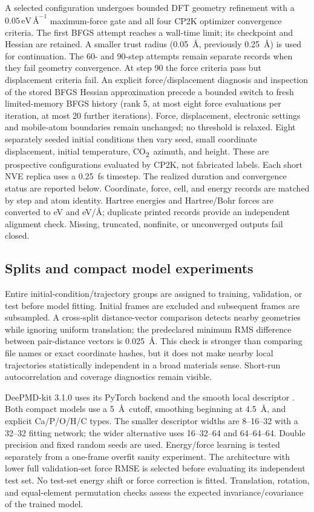 \documentclass[11pt,a4paper]{article}
\newcommand{\COtwo}{CO\textsubscript{2}}
\newcommand{\forceunit}{\,\mathrm{eV}\,\text{\AA}^{-1}}
\begin{document}
A selected configuration undergoes bounded DFT geometry refinement with a $0.05\forceunit$ maximum-force gate and all four CP2K optimizer convergence criteria. The first BFGS attempt reaches a wall-time limit; its checkpoint and Hessian are retained. A smaller trust radius (0.05~\AA, previously 0.25~\AA) is used for continuation. The 60- and 90-step attempts remain separate records when they fail geometry convergence. At step 90 the force criteria pass but displacement criteria fail. An explicit force/displacement diagnosis and inspection of the stored BFGS Hessian approximation precede a bounded switch to fresh limited-memory BFGS history (rank 5, at most eight force evaluations per iteration, at most 20 further iterations). Force, displacement, electronic settings and mobile-atom boundaries remain unchanged; no threshold is relaxed. Eight separately seeded initial conditions then vary seed, small coordinate displacement, initial temperature, \COtwo\ azimuth, and height. These are prospective configurations evaluated by CP2K, not fabricated labels. Each short NVE replica uses a 0.25~fs timestep. The realized duration and convergence status are reported below. Coordinate, force, cell, and energy records are matched by step and atom identity. Hartree energies and Hartree/Bohr forces are converted to eV and eV/\AA; duplicate printed records provide an independent alignment check. Missing, truncated, nonfinite, or unconverged outputs fail closed.

\subsection{Splits and compact model experiments}
Entire initial-condition/trajectory groups are assigned to training, validation, or test before model fitting. Initial frames are excluded and subsequent frames are subsampled. A cross-split distance-vector comparison detects nearby geometries while ignoring uniform translation; the predeclared minimum RMS difference between pair-distance vectors is 0.025~\AA. This check is stronger than comparing file names or exact coordinate hashes, but it does not make nearby local trajectories statistically independent in a broad materials sense. Short-run autocorrelation and coverage diagnostics remain visible.

DeePMD-kit 3.1.0 uses its PyTorch backend \citep{Zeng_JChemTheoryComput_2025_v21_p4375} and the smooth local descriptor \citep{Zhang_BookChap_NIPS_2018_v31_p4436}. Both compact models use a 5~\AA\ cutoff, smoothing beginning at 4.5~\AA, and explicit Ca/P/O/H/C types. The smaller descriptor widths are 8--16--32 with a 32--32 fitting network; the wider alternative uses 16--32--64 and 64--64--64. Double precision and fixed random seeds are used. Energy/force learning is tested separately from a one-frame overfit sanity experiment. The architecture with lower full validation-set force RMSE is selected before evaluating its independent test set. No test-set energy shift or force correction is fitted. Translation, rotation, and equal-element permutation checks assess the expected invariance/covariance of the trained model.
\end{document}
